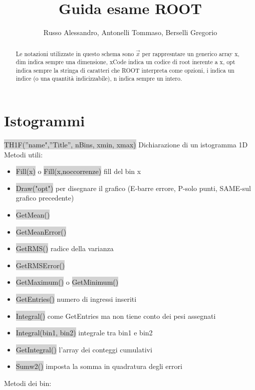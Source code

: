 \documentclass[a4paper]{article}
\begin{document}
	\title{Guida esame ROOT}
	\author{Russo Alessandro, Antonelli Tommaso, Berselli Gregorio}
    \maketitle
\begin{abstract}
    Le notazioni utilizzate in questo schema sono $\vec{x}$ per rappresntare un generico array x, dim indica sempre una dimensione, xCode indica un codice di root inerente a x, opt indica sempre la stringa di caratteri che ROOT interpreta come opzioni, i indica un indice (o una quantità indicizzabile), n indica sempre un intero.
\end{abstract}
\section{Istogrammi}
    \colorbox{LightGray}{TH1F(”name",”Title”, nBins, xmin, xmax)} Dichiarazione di un istogramma 1D
    Metodi utili:
    \begin{itemize}
        \item \colorbox{LightGray}{Fill(x)} o \colorbox{LightGray}{Fill(x,noccorrenze)} fill del bin x 
        \item \colorbox{LightGray}{Draw("opt")} per disegnare il grafico (E-barre errore, P-solo punti, SAME-sul grafico precedente)
        \item \colorbox{LightGray}{GetMean()}
        \item \colorbox{LightGray}{GetMeanError()}
        \item \colorbox{LightGray}{GetRMS()} radice della varianza
        \item \colorbox{LightGray}{GetRMSError()}
        \item \colorbox{LightGray}{GetMaximum()} o \colorbox{LightGray}{GetMinimum()}
        \item \colorbox{LightGray}{GetEntries()} numero di ingressi inseriti
        \item \colorbox{LightGray}{Integral()} come GetEntries ma non tiene conto dei pesi assegnati
        \item \colorbox{LightGray}{Integral(bin1, bin2)} integrale tra bin1 e bin2
        \item \colorbox{LightGray}{GetIntegral()} l'array dei conteggi cumulativi
        \item \colorbox{LightGray}{Sumw2()} imposta la somma in quadratura degli errori
    \end{itemize}
    Metodi dei bin:
\end{document}
